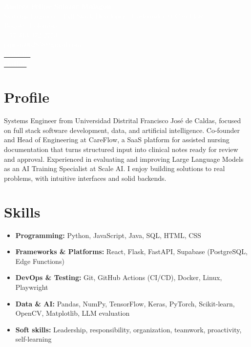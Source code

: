 \documentclass[letterpaper,12pt]{article}
\begin{document}
\begin{tcolorbox}[colback=primary,colframe=primary,sharp corners]
\begin{minipage}{0.2\textwidth}
\end{minipage}
\hfill
\begin{minipage}{0.75\textwidth}
    \raggedleft
    \textcolor{white}{\textbf{\Huge Andres Felipe Salazar Malagon}}\\[0.2cm]
    \textcolor{white}{\large Systems Engineer $|$ Full Stack Developer $|$ Co-founder @ CareFlow}\\[0.2cm]
    \textcolor{white}{Bogotá, Colombia} \\
    \textcolor{white}{+57 313 372 2773} \\
    \textcolor{white}{pipesm062858@gmail.com} \\
    \href{https://www.linkedin.com/in/andres-felipe-salazar-malagon-7b4092320}{\textcolor{white}{LinkedIn}} \\
    \href{https://github.com/SalazarMalagon}{\textcolor{white}{GitHub}}
\end{minipage}
\end{tcolorbox}

\vspace{0cm}
\section*{\textcolor{primary}{Profile}}
Systems Engineer from Universidad Distrital Francisco José de Caldas, focused on full stack software development, data, and artificial intelligence. Co-founder and Head of Engineering at CareFlow, a SaaS platform for assisted nursing documentation that turns structured input into clinical notes ready for review and approval. Experienced in evaluating and improving Large Language Models as an AI Training Specialist at Scale AI. I enjoy building solutions to real problems, with intuitive interfaces and solid backends.

\section*{\textcolor{primary}{Skills}}
\begin{itemize}
    \item \textbf{Programming:} Python, JavaScript, Java, SQL, HTML, CSS
    \item \textbf{Frameworks \& Platforms:} React, Flask, FastAPI, Supabase (PostgreSQL, Edge Functions)
    \item \textbf{DevOps \& Testing:} Git, GitHub Actions (CI/CD), Docker, Linux, Playwright
    \item \textbf{Data \& AI:} Pandas, NumPy, TensorFlow, Keras, PyTorch, Scikit-learn, OpenCV, Matplotlib, LLM evaluation
    \item \textbf{Soft skills:} Leadership, responsibility, organization, teamwork, proactivity, self-learning
\end{itemize}
\end{document}
